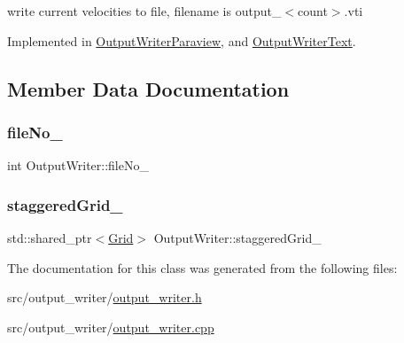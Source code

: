 write current velocities to file, filename is output\+\_\+$<$count$>$.\+vti 



Implemented in \mbox{\hyperlink{classOutputWriterParaview_a9e203b63d0e2f26ad53d18ee1821c6bb}{Output\+Writer\+Paraview}}, and \mbox{\hyperlink{classOutputWriterText_a25a12ea2524fc34e9acb19ef1f4c7431}{Output\+Writer\+Text}}.



\subsection{Member Data Documentation}
\mbox{\label{classOutputWriter_a69d167e2526407602dce26ca7a2b9248}} 
\subsubsection{\texorpdfstring{fileNo\_}{fileNo\_}}
{\footnotesize\ttfamily int Output\+Writer\+::file\+No\+\_\+\hspace{0.3cm}{\ttfamily [protected]}}

\mbox{\label{classOutputWriter_a6cfc5734d2c819d75fbe39a98b1e0d31}} 
\subsubsection{\texorpdfstring{staggeredGrid\_}{staggeredGrid\_}}
{\footnotesize\ttfamily std\+::shared\+\_\+ptr$<$\mbox{\hyperlink{classGrid}{Grid}}$>$ Output\+Writer\+::staggered\+Grid\+\_\+\hspace{0.3cm}{\ttfamily [protected]}}



The documentation for this class was generated from the following files\+:\begin{DoxyCompactItemize}
\item 
src/output\+\_\+writer/\mbox{\hyperlink{output__writer_8h}{output\+\_\+writer.\+h}}\item 
src/output\+\_\+writer/\mbox{\hyperlink{output__writer_8cpp}{output\+\_\+writer.\+cpp}}\end{DoxyCompactItemize}
